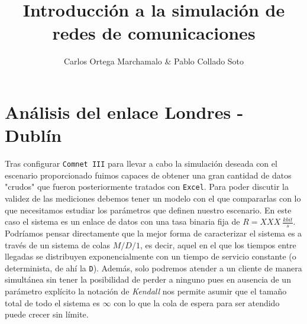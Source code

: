 \documentclass{report}[10 pt]
\title{Introducción a la simulación de redes de comunicaciones}
\author{Carlos Ortega Marchamalo \& Pablo Collado Soto}
\date{}
\begin{document}
	\maketitle

	\section{Análisis del enlace Londres - Dublín}
		Tras configurar \texttt{Comnet III} para llevar a cabo la simulación deseada con el escenario proporcionado fuimos capaces de obtener una gran cantidad de datos "crudos" que fueron posteriormente tratados con \texttt{Excel}. Para poder discutir la validez de las mediciones debemos tener un modelo con el que compararlas con lo que necesitamos estudiar los parámetros que definen nuestro escenario. En este caso el sistema es un enlace de datos con una tasa binaria fija de $R = XXX\ \frac{kbit}{s}$. Podríamos pensar directamente que la mejor forma de caracterizar el sistema es a través de un sistema de colas $M/D/1$, es decir, aquel en el que los tiempos entre llegadas se distribuyen exponencialmente con un tiempo de servicio constante (o determinista, de ahí la \texttt{D}). Además, solo podremos atender a un cliente de manera simultánea sin tener la posibilidad de perder a ninguno pues en ausencia de un parámetro explícito la notación de \textit{Kendall} nos permite asumir que el tamaño total de todo el sistema es $\infty$ con lo que la cola de espera para ser atendido puede crecer sin límite.
		\\
\end{document}
